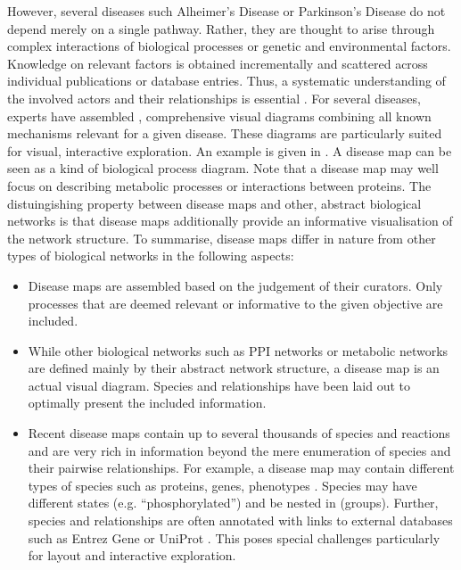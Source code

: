 \documentclass[
	fontsize=10pt, %
	twoside=false, %
	secnumdepth=1, %
  toc=indentunnumbered %
]{kaobook}
\begin{document}
However, several diseases such Alheimer's Disease or Parkinson's Disease do not depend
merely on a single pathway. Rather, they are thought to arise through complex
interactions of biological processes or genetic and environmental factors.
Knowledge on relevant factors is obtained incrementally and scattered across
individual publications or database entries.
Thus, a systematic understanding of the involved actors and their
relationships is essential
\cite{ostaszewski_CommunitydrivenRoadmapIntegrated_2019,
  mazein_SystemsMedicineDisease_2018}.
% 
For several diseases, experts have assembled , comprehensive
visual diagrams combining all known mechanisms relevant for a given disease.
These diagrams are particularly suited for visual, interactive exploration. An
example is given in . A disease map can be
seen as a kind of biological process diagram. Note that a disease map may well
focus on describing metabolic processes or interactions between proteins. The
distuingishing property between disease maps and other, abstract biological
networks is that disease maps additionally provide an informative visualisation
of the network structure.
To summarise, disease maps differ in nature from other types of biological
networks in the following aspects:
\begin{itemize}
\item Disease maps are assembled based on the judgement of their curators. Only
  processes that are deemed relevant or informative to the given objective are
  included.
\item While other biological networks such as PPI networks or metabolic networks
  are defined mainly by their abstract network structure, a disease map is an
  actual visual diagram. Species and relationships have been laid out to
  optimally present the included information.
\item
  Recent disease maps contain up to several thousands of species and reactions and
  are very rich in information beyond the mere enumeration of species and their
  pairwise relationships. For example, a disease map may contain different types
  of species such as proteins, genes, phenotypes \etc. Species may have
  different states (e.g. ``phosphorylated'') and be nested in 
  (groups). Further, species and relationships are often
  annotated with links to external databases such as Entrez Gene
  \cite{maglott_EntrezGeneGenecentered_2005} or UniProt
  \cite{theuniprotconsortium_UniProtUniversalProtein_2021}.
  This poses special challenges particularly for layout and
  interactive exploration. 
\end{itemize}
\end{document}
